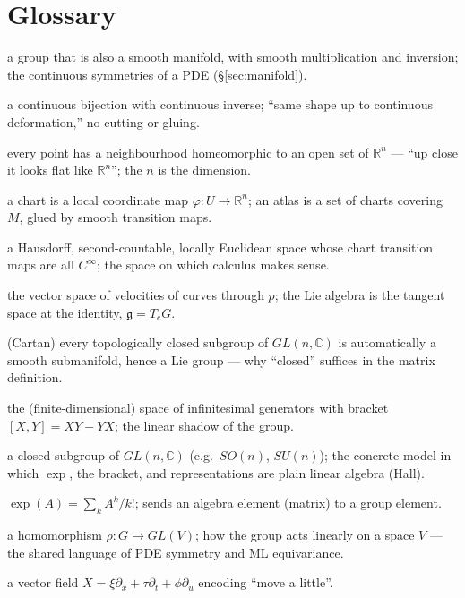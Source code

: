 \documentclass[11pt]{article}
\theoremstyle{definition}
\theoremstyle{remark}
\newcommand{\g}{\mathfrak{g}}
\newcommand{\R}{\mathbb{R}}
\begin{document}
\section*{Glossary}
\begin{description}[nosep, style=nextline]
  \item[Lie group] a group that is also a smooth manifold, with smooth multiplication and inversion; the continuous symmetries of a PDE (\S\ref{sec:manifold}).
  \item[Homeomorphism] a continuous bijection with continuous inverse; ``same shape up to continuous deformation,'' no cutting or gluing.
  \item[Locally Euclidean] every point has a neighbourhood homeomorphic to an open set of $\R^n$ --- ``up close it looks flat like $\R^n$''; the $n$ is the dimension.
  \item[Chart / atlas] a chart is a local coordinate map $\varphi:U\to\R^n$; an atlas is a set of charts covering $M$, glued by smooth transition maps.
  \item[(Smooth) manifold] a Hausdorff, second-countable, locally Euclidean space whose chart transition maps are all $C^\infty$; the space on which calculus makes sense.
  \item[Tangent space $T_pM$] the vector space of velocities of curves through $p$; the Lie algebra is the tangent space at the identity, $\g=T_eG$.
  \item[Closed-subgroup theorem] (Cartan) every topologically closed subgroup of $GL(n,\mathbb{C})$ is automatically a smooth submanifold, hence a Lie group --- why ``closed'' suffices in the matrix definition.
  \item[Lie algebra $\g$] the (finite-dimensional) space of infinitesimal generators with bracket
        $[X,Y]=XY-YX$; the linear shadow of the group.
  \item[Matrix (linear) Lie group] a closed subgroup of $GL(n,\mathbb{C})$ (e.g.\ $SO(n)$, $SU(n)$); the
        concrete model in which $\exp$, the bracket, and representations are plain linear algebra (Hall).
  \item[Matrix exponential] $\exp(A)=\sum_k A^k/k!$; sends an algebra element (matrix) to a group element.
  \item[Representation] a homomorphism $\rho:G\to GL(V)$; how the group acts linearly on a space $V$ ---
        the shared language of PDE symmetry and ML equivariance.
  \item[Generator] a vector field $X=\xi\partial_x+\tau\partial_t+\phi\partial_u$ encoding ``move a little''.

\end{description}
\end{document}
